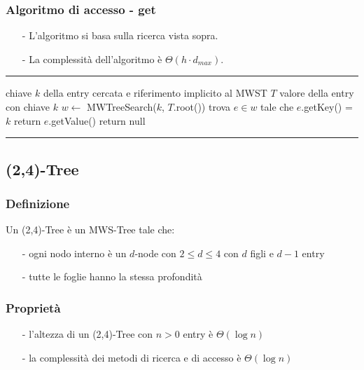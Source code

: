 \documentclass[a4paper]{article}
\makeatletter
\newenvironment{algo}[4]{
	\noindent\rule{\textwidth}{0.4pt}
	\begin{algorithmic}[1]
		\addtocounter{ALG@line}{-1}
		\Procedure{#1}{#2}
		\Require #3
		\Ensure #4
		\Statex }{
		\EndProcedure
	\end{algorithmic}
	\rule{\textwidth}{0.4pt}}
\makeatother
\begin{document}
\subsubsection*{Algoritmo di accesso - get}
\begin{itemize}[topsep=3pt, itemsep=0pt]
	\item[-] L'algoritmo si basa sulla ricerca vista sopra.
	\item[-] La complessità dell'algoritmo è \(\Theta(h \cdot d_{max})\).
\end{itemize}
\begin{algo}{get}{$k$}{chiave $k$ della entry cercata e riferimento implicito al MWST $T$}{valore della entry con chiave $k$}
	\State $w \gets$ MWTreeSearch($k$, $T$.root())
		\State trova $e \in w$ tale che $e$.getKey() = $k$
		\State return $e$.getValue()
	\Else
		\State return null
	\EndIf
\end{algo}

\newpage

\subsection{(2,4)-Tree}
\subsubsection*{Definizione}
Un (2,4)-Tree è un MWS-Tree tale che:
\begin{itemize}[topsep=3pt, itemsep=0pt]
	\item[-] ogni nodo interno è un \(d\)-node con \(2 \leq d \leq 4\) con \(d\) figli e \(d-1\) entry
	\item[-] tutte le foglie hanno la stessa profondità
\end{itemize}

\subsubsection*{Proprietà}
\begin{itemize}[topsep=3pt, itemsep=0pt]
	\item[-] l'altezza di un (2,4)-Tree con \(n>0\) entry è \(\Theta(\log n)\)
	\item[-] la complessità dei metodi di ricerca e di accesso è \(\Theta(\log n)\)
\end{itemize}
\end{document}
